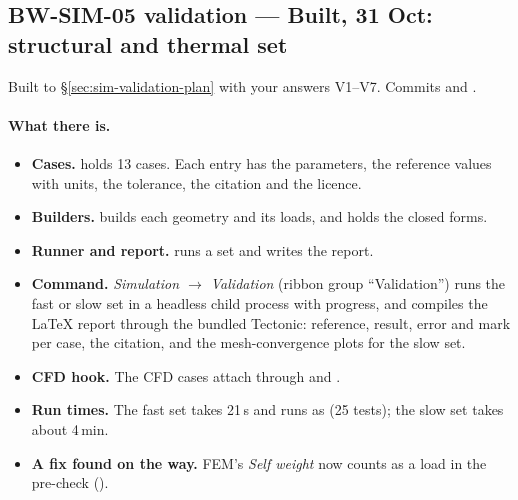 \subsection{BW-SIM-05 validation --- Built, 31 Oct: structural and thermal set}\label{sec:sim-validation-built}

Built to \S\ref{sec:sim-validation-plan} with your answers V1--V7. Commits  and .

\paragraph{What there is.}
\begin{itemize}[nosep]
  \item \textbf{Cases.}  holds 13 cases. Each entry has the parameters, the
        reference values with units, the tolerance, the citation and the licence.
  \item \textbf{Builders.}  builds each geometry and its loads, and holds
        the closed forms.
  \item \textbf{Runner and report.}  runs a set and writes the report.
  \item \textbf{Command.} \emph{Simulation $\rightarrow$ Validation} (ribbon group ``Validation'') runs the fast or
        slow set in a headless child process with progress, and compiles the \LaTeX{} report through the bundled
        Tectonic: reference, result, error and mark per case, the citation, and the mesh-convergence plots for
        the slow set.
  \item \textbf{CFD hook.} The CFD cases attach through  and .
  \item \textbf{Run times.} The fast set takes 21\,s and runs as  (25 tests); the slow
        set takes about 4\,min.
  \item \textbf{A fix found on the way.} FEM's \emph{Self weight} now counts as a load in the pre-check
        ().
\end{itemize}

